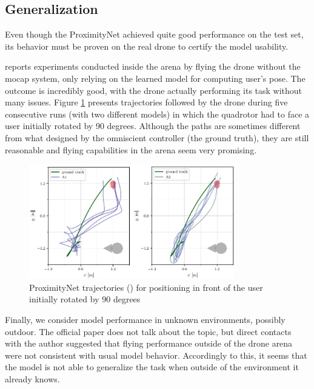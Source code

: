 \subsection{Generalization}
\label{subsec:proximitynet-generalization}

Even though the ProximityNet achieved quite good performance on the test set, its behavior must be proven on the real drone to certify the model usability.

\cite{mantegazza2019visionbased} reports experiments conducted inside the arena by flying the drone without the \gls{mocap} system, only relying on the learned model for computing user's pose. The outcome is incredibly good, with the drone actually performing its task without many issues. Figure \ref{fig:proximitynet-trajectories} presents trajectories followed by the drone during five consecutive runs (with two different models) in which the quadrotor had to face a user initially rotated by 90 degrees. Although the paths are sometimes different from what designed by the omniscient controller (the ground truth), they are still reasonable and flying capabilities in the arena seem very promising.

\begin{figure}[!htb]
	\centering
	\includegraphics[width=0.8\textwidth]{"contents/images/03-proximitynet-trajectories"}
	\caption[ProximityNet trajectories (\cite{mantegazza2019visionbased}) for positioning in front of the user initially rotated by 90 degrees]{ProximityNet trajectories (\cite{mantegazza2019visionbased}) for positioning in front of the user initially rotated by 90 degrees}
	\label{fig:proximitynet-trajectories}
\end{figure}

\medskip

Finally, we consider model performance in unknown environments, possibly outdoor. The official paper does not talk about the topic, but direct contacts with the author suggested that flying performance outside of the drone arena were not consistent with usual model behavior. Accordingly to this, it seems that the model is not able to generalize the task when outside of the environment it already knows.

